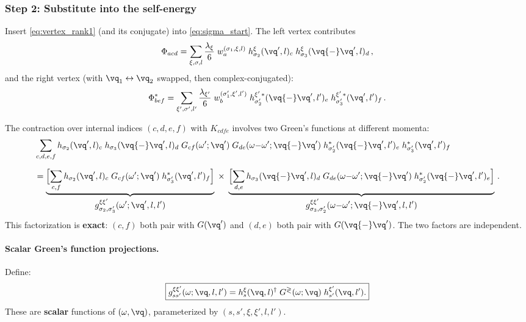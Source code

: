 \subsubsection{Step 2: Substitute into the self-energy}
\label{sssub:step2}

Insert \cref{eq:vertex_rank1} (and its conjugate) into
\cref{eq:sigma_start}.  The left vertex contributes
\begin{equation}
  \Phi_{acd} = \sum_{\xi,\sigma,l}
    \frac{\lambda_\xi}{6}\;
    w_a^{(\sigma_1,\xi,l)}\;
    h_{\sigma_2}^{\xi}(\vq', l)_c\;
    h_{\sigma_3}^{\xi}(\vq{-}\vq', l)_d\,,
\end{equation}
and the right vertex (with $\vq_1 \leftrightarrow \vq_2$ swapped,
then complex-conjugated):
\begin{equation}
  \Phi^*_{bef} = \sum_{\xi',\sigma',l'}
    \frac{\lambda_{\xi'}}{6}\;
    w_b^{(\sigma'_1,\xi',l')}\;
    h_{\sigma'_2}^{\xi'\,*}(\vq{-}\vq', l')_e\;
    h_{\sigma'_3}^{\xi'\,*}(\vq', l')_f\,.
\end{equation}

The contraction over internal indices $(c,d,e,f)$ with $K_{cdfe}$
involves two Green's functions at different momenta:
\begin{align}\label{eq:contraction_step}
  &\sum_{c,d,e,f}
    h_{\sigma_2}(\vq', l)_c\;
    h_{\sigma_3}(\vq{-}\vq', l)_d\;
    G_{cf}(\omega';\vq')\;
    G_{de}(\omega{-}\omega';\vq{-}\vq')\;
    h^*_{\sigma'_2}(\vq{-}\vq', l')_e\;
    h^*_{\sigma'_3}(\vq', l')_f
  \notag\\[6pt]
  &=
    \underbrace{
      \Bigl[\sum_{c,f}
      h_{\sigma_2}(\vq', l)_c\;
      G_{cf}(\omega';\vq')\;
      h^*_{\sigma'_3}(\vq', l')_f
      \Bigr]
    }_{\displaystyle
      g_{\sigma_2,\sigma'_3}^{\xi\xi'}(\omega';\vq',l,l')
    }
    \;\times\;
    \underbrace{
      \Bigl[\sum_{d,e}
      h_{\sigma_3}(\vq{-}\vq', l)_d\;
      G_{de}(\omega{-}\omega';\vq{-}\vq')\;
      h^*_{\sigma'_2}(\vq{-}\vq', l')_e
      \Bigr]
    }_{\displaystyle
      g_{\sigma_3,\sigma'_2}^{\xi\xi'}(\omega{-}\omega';\vq{-}\vq',l,l')
    }\,.
\end{align}
This factorization is \textbf{exact}: $(c,f)$ both pair with
$G(\vq')$ and $(d,e)$ both pair with $G(\vq{-}\vq')$.  The two
factors are independent.

\paragraph{Scalar Green's function projections.}
Define:
\begin{equation}\label{eq:scalar_proj}
  \boxed{
  g_{ss'}^{\xi\xi'}(\omega;\vq,l,l')
  = h_s^{\xi}(\vq, l)^\dagger\;
    G^{\gtrless}(\omega;\vq)\;
    h_{s'}^{\xi'}(\vq, l').
  }
\end{equation}
These are \textbf{scalar} functions of $(\omega, \vq)$, parameterized
by $(s,s',\xi,\xi',l,l')$.


